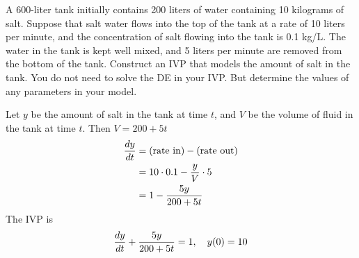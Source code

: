 \ifnum {}
\question[2]{} A 600-liter tank initially contains 200 liters of water containing 10 kilograms of salt. Suppose that salt water flows into the top of the tank at a rate of 10 liters per minute, and the concentration of salt flowing into the tank is 0.1 kg/L. The water in the tank is kept well mixed, and 5 liters per minute are removed from the bottom of the tank. Construct an IVP that models the amount of salt in the tank. You do not need to solve the DE in your IVP. But determine the values of any parameters in your model. 

\ifnum {} {\color{DarkBlue} 
Let $y$ be the amount of salt in the tank at time $t$, and $V$ be the volume of fluid in the tank at time $t$. Then $V = 200+5t$
\begin{align}
    {\frac{dy}{dt}} 
    &= \left(\text{rate in}\right) - \left(\text{rate out}\right) \\
    &=10\cdot 0.1 - \frac{y}{V}\cdot 5 \\
    &= 1 - \frac{5y}{200+5t}
\end{align}
The IVP is
\begin{align}
    {\frac{dy}{dt}} + \frac{5y}{200+5t} = 1, \quad y(0) = 10
\end{align}
} 
\else 
\vspace{3cm}
\fi


